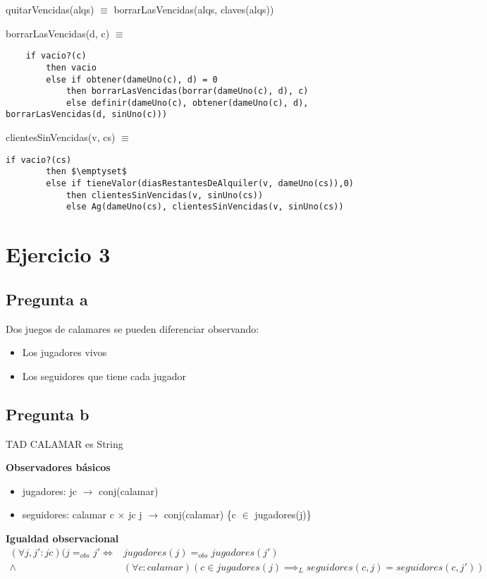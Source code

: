 quitarVencidas(alqs) $\equiv$ borrarLasVencidas(alqs, claves(alqs))

borrarLasVencidas(d, c) $\equiv$ 
\begin{lstlisting}
    if vacio?(c)
        then vacio
        else if obtener(dameUno(c), d) = 0
            then borrarLasVencidas(borrar(dameUno(c), d), c)
            else definir(dameUno(c), obtener(dameUno(c), d), borrarLasVencidas(d, sinUno(c)))
\end{lstlisting}

clientesSinVencidas(v, cs) $\equiv$ 
\begin{lstlisting}[mathescape=true]
    if vacio?(cs)
        then $\emptyset$
        else if tieneValor(diasRestantesDeAlquiler(v, dameUno(cs)),0)
            then clientesSinVencidas(v, sinUno(cs))
            else Ag(dameUno(cs), clientesSinVencidas(v, sinUno(cs))
\end{lstlisting}

\section{Ejercicio 3}

\subsection*{Pregunta a}
Dos juegos de calamares se pueden diferenciar observando:
\begin{itemize}
    \item Los jugadores vivos
    \item Los seguidores que tiene cada jugador
\end{itemize}
    
\subsection*{Pregunta b}

TAD CALAMAR es String

\textbf{Observadores básicos}
\begin{itemize}
    \item jugadores: jc $\rightarrow$ conj(calamar)
    \item seguidores: calamar c $\times$ jc j $\rightarrow$ conj(calamar) \{c $\in$ jugadores(j)\}
\end{itemize}


\textbf{Igualdad observacional}
\begin{align*}
(\forall j, j': jc)(j =_{obs} j' \iff &jugadores(j) =_{obs} jugadores(j') \\
                    \wedge &(\forall c: calamar)(c \in jugadores(j) \implies_{L} seguidores(c,j) = seguidores(c, j'))
\end{align*}
   
